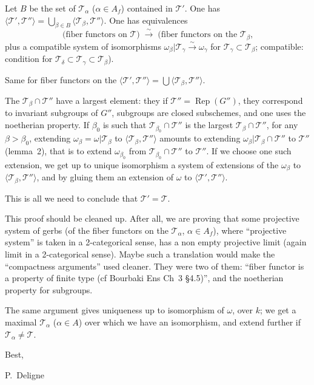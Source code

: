 \documentclass[11pt,a4paper]{article}
\theoremstyle{plain}
\theoremstyle{definition}
\DeclareMathOperator{\Rep}{Rep}
\begin{document}
Let $B$ be the set of $\mathcal{T}_\alpha$ ($\alpha \in A_f$) contained in
$\mathcal{T}'$. One has
$\langle \mathcal{T}', \mathcal{T}'' \rangle =
\bigcup_{\beta \in B} \langle \mathcal{T}_\beta, \mathcal{T}'' \rangle$.
One has equivalences
\[
\text{(fiber functors on } \mathcal{T} \text{)}
\;\xrightarrow{\sim}\;
\text{(fiber functors on the } \mathcal{T}_\beta\text{,}
\]
plus a compatible system of isomorphisms
$\omega_\beta|\mathcal{T}_\gamma \xrightarrow{\sim} \omega_\gamma$ for
$\mathcal{T}_\gamma \subset \mathcal{T}_\beta$; compatible: condition for
$\mathcal{T}_\delta \subset \mathcal{T}_\gamma \subset \mathcal{T}_\beta$).

Same for fiber functors on the
$\langle \mathcal{T}', \mathcal{T}'' \rangle =
\bigcup \langle \mathcal{T}_\beta, \mathcal{T}'' \rangle$.

The $\mathcal{T}_\beta \cap \mathcal{T}''$ have a largest element: they if
$\mathcal{T}'' = \Rep(G'')$, they correspond to invariant subgroups of $G''$,
subgroups are closed subschemes, and one uses the noetherian property. If
$\beta_0$ is such that $\mathcal{T}_{\beta_0} \cap \mathcal{T}''$ is the
largest $\mathcal{T}_\beta \cap \mathcal{T}''$, for any $\beta > \beta_0$,
extending $\omega_\beta = \omega|\mathcal{T}_\beta$ to
$\langle \mathcal{T}_\beta, \mathcal{T}'' \rangle$ amounts to extending
$\omega_\beta|\mathcal{T}_\beta \cap \mathcal{T}''$ to $\mathcal{T}''$
(lemma~2), that is to extend $\omega_{\beta_0}$ from
$\mathcal{T}_{\beta_0} \cap \mathcal{T}''$ to $\mathcal{T}''$. If we choose
one such extension, we get up to unique isomorphism a system of extensions of
the $\omega_\beta$ to $\langle \mathcal{T}_\beta, \mathcal{T}'' \rangle$, and
by gluing them an extension of $\omega$ to
$\langle \mathcal{T}', \mathcal{T}'' \rangle$.

This is all we need to conclude that $\mathcal{T}' = \mathcal{T}$.

This proof should be cleaned up. After all, we are proving that some projective
system of gerbs (of the fiber functors on the $\mathcal{T}_\alpha$,
$\alpha \in A_f$), where ``projective system'' is taken in a 2-categorical
sense, has a non empty projective limit (again limit in a 2-categorical sense).
Maybe such a translation would make the ``compactness arguments'' used cleaner.
They were two of them: ``fiber functor is a property of finite type (cf
Bourbaki Ens Ch~3 \S4.5)'', and the noetherian property for subgroups.

The same argument gives uniqueness up to isomorphism of $\omega$, over $k$; we
get a maximal $\mathcal{T}_\alpha$ ($\alpha \in A$) over which we have an
isomorphism, and extend further if $\mathcal{T}_\alpha \neq \mathcal{T}$.

\medskip
\medskip

\hfill Best,

\hfill P.~Deligne
\end{document}
